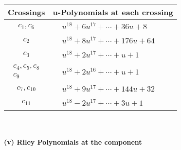 \documentclass[1p]{elsarticle_modified}
\theoremstyle{definition}
\begin{document}
\begin{tabular}{m{50pt}|m{274pt}}
Crossings & \hspace{64pt}u-Polynomials at each crossing \\
\hline $$\begin{aligned}c_{1},c_{6}\end{aligned}$$&$\begin{aligned}
&u^{18}+6 u^{17}+\cdots+36 u+8
\end{aligned}$\\
\hline $$\begin{aligned}c_{2}\end{aligned}$$&$\begin{aligned}
&u^{18}+8 u^{17}+\cdots+176 u+64
\end{aligned}$\\
\hline $$\begin{aligned}c_{3}\end{aligned}$$&$\begin{aligned}
&u^{18}+2 u^{17}+\cdots+u+1
\end{aligned}$\\
\hline $$\begin{aligned}c_{4},c_{5},c_{8}\\c_{9}\end{aligned}$$&$\begin{aligned}
&u^{18}+2 u^{16}+\cdots+u+1
\end{aligned}$\\
\hline $$\begin{aligned}c_{7},c_{10}\end{aligned}$$&$\begin{aligned}
&u^{18}+9 u^{17}+\cdots+144 u+32
\end{aligned}$\\
\hline $$\begin{aligned}c_{11}\end{aligned}$$&$\begin{aligned}
&u^{18}-2 u^{17}+\cdots+3 u+1
\end{aligned}$\\
\hline
\end{tabular}\\~\\
\newpage\renewcommand{\arraystretch}{1}
\flushleft \textbf{(v) Riley Polynomials at the component}\newline \\
\end{document}
